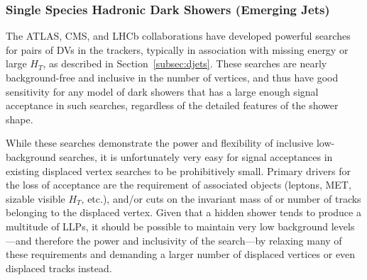 \subsubsection{Single Species Hadronic Dark Showers (Emerging Jets)}
\label{sec:darkshoweremergingjets}

The ATLAS, CMS, and LHCb collaborations have developed powerful searches for pairs of DVs in the trackers, typically in association with missing energy or large $H_T$, as described in Section~\ref{subsec:djets}. These searches are nearly background-free and inclusive in the number of vertices, and thus have good sensitivity for any model of dark showers that has a large enough signal acceptance in such searches, regardless of the detailed features of the shower shape.

While these searches demonstrate the power and flexibility of inclusive low-background searches, it is unfortunately very easy for signal acceptances in existing displaced vertex searches to be prohibitively small.  Primary drivers for the loss of acceptance are the requirement of associated objects (leptons, MET, sizable visible $H_T$, etc.), and/or cuts on the invariant mass of or number of tracks belonging to the displaced vertex. Given that a hidden shower tends to produce a multitude of LLPs, it should be possible to maintain very low background levels---and therefore the power and inclusivity of the search---by relaxing many of these requirements and demanding a larger number of displaced vertices or even displaced tracks instead.

